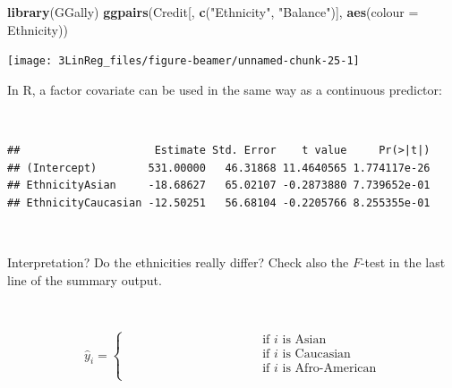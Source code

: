 \documentclass[
  10pt,
  ignorenonframetext,
]{beamer}
\newenvironment{Shaded}{\begin{snugshade}}{\end{snugshade}}
\newcommand{\AttributeTok}[1]{\textcolor[rgb]{0.13,0.29,0.53}{#1}}
\newcommand{\FunctionTok}[1]{\textcolor[rgb]{0.13,0.29,0.53}{\textbf{#1}}}
\newcommand{\NormalTok}[1]{#1}
\newcommand{\OtherTok}[1]{\textcolor[rgb]{0.56,0.35,0.01}{#1}}
\newcommand{\SpecialCharTok}[1]{\textcolor[rgb]{0.81,0.36,0.00}{\textbf{#1}}}
\newcommand{\StringTok}[1]{\textcolor[rgb]{0.31,0.60,0.02}{#1}}
\begin{document}
\begin{frame}[fragile]
\scriptsize

\begin{Shaded}
\begin{Highlighting}[]
\FunctionTok{library}\NormalTok{(GGally)}
\FunctionTok{ggpairs}\NormalTok{(Credit[, }\FunctionTok{c}\NormalTok{(}\StringTok{"Ethnicity"}\NormalTok{, }\StringTok{"Balance"}\NormalTok{)], }\FunctionTok{aes}\NormalTok{(}\AttributeTok{colour =}\NormalTok{ Ethnicity))}
\end{Highlighting}
\end{Shaded}

\texttt{[image: 3LinReg\_files/figure-beamer/unnamed-chunk-25-1]}
\end{frame}

\begin{frame}[fragile]
In R, a factor covariate can be used in the same way as a continuous
predictor:

\(~\)

\scriptsize

\begin{Shaded}
\end{Shaded}

\begin{verbatim}
##                     Estimate Std. Error    t value     Pr(>|t|)
## (Intercept)        531.00000   46.31868 11.4640565 1.774117e-26
## EthnicityAsian     -18.68627   65.02107 -0.2873880 7.739652e-01
## EthnicityCaucasian -12.50251   56.68104 -0.2205766 8.255355e-01
\end{verbatim}

\(~\)

\normalsize

Interpretation? Do the ethnicities really differ? Check also the
\(F\)-test in the last line of the summary output.

\(~\)

\begin{equation*}
\hat{y}_i = \left\{
\begin{array}{ll}
\qquad \qquad\qquad \qquad\qquad & \text{if $i$ is Asian}\\[2mm]
\qquad \qquad\qquad \qquad\qquad & \text{if $i$ is Caucasian}\\[2mm]
\qquad \qquad\qquad \qquad\qquad & \text{if $i$ is Afro-American}\\
\end{array}\right.
\end{equation*}
\end{frame}
\end{document}
